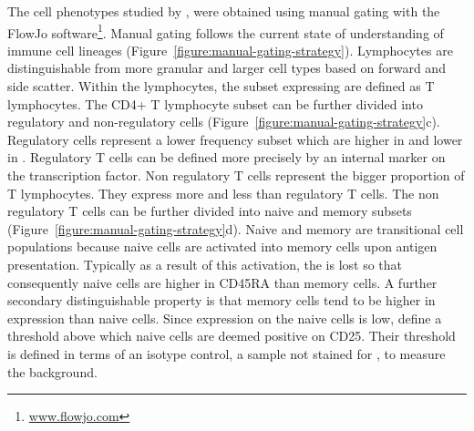 The cell phenotypes studied by \citet{Dendrou:2009dv}, were obtained using manual gating with the FlowJo software\footnote{\url{www.flowjo.com}}.
Manual gating follows the current state of understanding of immune cell lineages (Figure~\ref{figure:manual-gating-strategy}).
Lymphocytes are distinguishable from more granular and larger cell types based on forward and side scatter.
Within the lymphocytes, the subset expressing  are defined as T lymphocytes.
The CD4+ T lymphocyte subset can be further divided into regulatory and non-regulatory cells (Figure~\ref{figure:manual-gating-strategy}c).
Regulatory cells represent a lower frequency subset which are higher in  and lower in .
Regulatory T cells can be defined more precisely by an internal marker on the  transcription factor.
Non regulatory T cells represent the bigger proportion of T lymphocytes.
They express more  and less  than regulatory T cells.
The non regulatory T cells can be further divided into naive and memory subsets (Figure~\ref{figure:manual-gating-strategy}d).
Naive and memory are transitional cell populations because naive cells are activated into memory cells upon antigen presentation.
Typically as a result of this activation, the  is lost so that consequently naive cells are higher in CD45RA than memory cells.
A further secondary distinguishable property is that memory cells tend to be higher in  expression than naive cells.
Since  expression on the naive cells is low, \citet{Dendrou:2009dv} define a threshold above which naive cells are deemed positive on CD25.
Their threshold is defined in terms of an isotype control, a sample not stained for , to measure the background.

